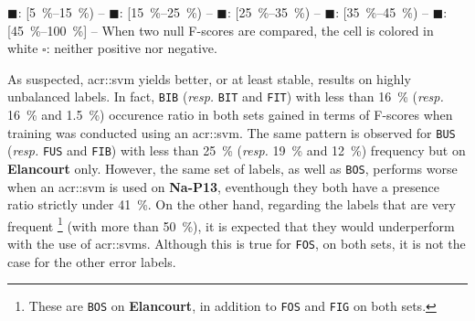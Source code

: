 \begin{table}[htbp]
{                \textcolor{GAIN0515}{\(\blacksquare\)}: [\SIrange[range-phrase={, }]{5}{15}{\percent}) --
                \textcolor{GAIN1525}{\(\blacksquare\)}: [\SIrange[range-phrase={, }]{15}{25}{\percent}) --
                \textcolor{GAIN2535}{\(\blacksquare\)}: [\SIrange[range-phrase={, }]{25}{35}{\percent}) --
                \textcolor{GAIN3545}{\(\blacksquare\)}: [\SIrange[range-phrase={, }]{35}{45}{\percent}) --
                \textcolor{GAIN45}{\(\blacksquare\)}: [\SIrange[range-phrase={, }]{45}{100}{\percent}] --
                When two null F-scores are compared, the cell is colored in white \(\square\): neither positive nor negative.
            }
        \end{table}

        As suspected, \gls{acr::svm} yields better, or at least stable, results on highly unbalanced labels.
        In fact, \texttt{BIB} (\textit{resp.} \texttt{BIT} and \texttt{FIT}) with less than \SI{16}{\percent} (\textit{resp.} \SI{16}{\percent} and \SI{1.5}{\percent}) occurence ratio in both sets gained in terms of F-scores when training was conducted using an \gls{acr::svm}.
        The same pattern is observed for \texttt{BUS} (\textit{resp.} \texttt{FUS} and \texttt{FIB}) with less than \SI{25}{\percent} (\textit{resp.} \SI{19}{\percent} and \SI{12}{\percent}) frequency but on \textbf{Elancourt} only.
        However, the same set of labels, as well as \texttt{BOS}, performs worse when an \gls{acr::svm} is used on \textbf{Na-P13}, eventhough they both have a presence ratio strictly under \SI{41}{\percent}.
        On the other hand, regarding the labels that are very frequent \footnote{
            These are \texttt{BOS} on \textbf{Elancourt}, in addition to \texttt{FOS} and \texttt{FIG} on both sets.
        } (with more than \SI{50}{\percent}), it is expected that they would underperform with the use of \glspl{acr::svm}.
        Although this is true for \texttt{FOS}, on both sets, it is not the case for the other error labels.\\

